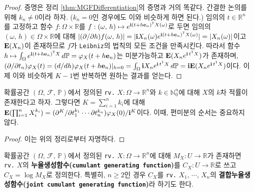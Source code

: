 \begin{proof}
    증명은 정리 \ref{thm:MGFDifferentiation}의 증명과 거의 똑같다. 간결한 논의를 위해 $k_n\ne0$이라 하자. ($k_n=0$인 경우에도 이와 비슷하게 하면 된다.) 임의의 $t\in\mathbb{R}^n$를 고정하고 함수 $f:\Omega\times\mathbb{R}$를 $f:(\omega,\,h)\mapsto e^{\mathbf{i}(t+h\mathbf{e}_n)^{\mathsf{T}} X(\omega)}$로 두면 임의의 $(\omega,\,h)\in\Omega\times\mathbb{R}$에 대해 $|(\partial/\partial h)f(\omega,\,h)|=|\mathbf{i} X_n(\omega)e^{\mathbf{i}(t+h\mathbf{e}_n)^{\mathsf{T}} X(\omega)}|=|X_n(\omega)|$이고 $\mathbf{E}(X_n)$이 존재하므로 $f$가 \texttt{Leibniz}의 법칙의 모든 조건을 만족시킨다. 따라서 함수 $h\mapsto\int_\Omega e^{\mathbf{i}(t+h\mathbf{e}_n)^{\mathsf{T}} X}\,d\mathbb{P}=\varphi_X(t+h\mathbf{e}_n)$는 미분가능하고 $\mathbf{E}(X_ne^{\mathbf{i}\,t^{\mathsf{T}} X})$가 존재하며, $(\partial/\partial t_n)\varphi_X(t)=(d/dh)\varphi_X(t+h\mathbf{e}_n)\vert_{h=0}=\int_\Omega\mathbf{i} X_ne^{\mathbf{i}\,t^{\mathsf{T}} X}\,d\mathbb{P}=\mathbf{i}\mathbf{E}(X_ne^{\mathbf{i}\,t^{\mathsf{T}} X})$이다. 이제 이와 비슷하게 $K-1$번 반복하면 원하는 결과를 얻는다.
\end{proof}

\begin{corollary}
    확률공간 $(\Omega,\,\mathcal{F},\,\mathbb{P})$에서 정의된 \texttt{rv.} $X:\Omega\to\mathbb{R}^n$와 $k\in\mathbb{N}_0^n$에 대해 $X$의 $k$차 적률이 존재한다고 하자. 그렇다면 $K=\sum_{i=1}^nk_i$에 대해 $\mathbf{E}(\prod_{i=1}^nX_i^{k_i})=(\partial^K/\partial t_1^{k_1}\cdots\partial t_n^{k_n})\varphi_X(0)/\mathbf{i}^K$이다. 이때, 편미분의 순서는 중요하지 않다.
\end{corollary}

\begin{proof}
    이는 위의 정리로부터 자명하다.
\end{proof}

\begin{definition}
    확률공간 $(\Omega,\,\mathcal{F},\,\mathbb{P})$에서 정의된 \texttt{rv.} $X:\Omega\to\mathbb{R}^n$에 대해 $M_X:U\to\mathbb{R}$가 존재하면 \texttt{rv.} $X$의 \textbf{누율생성함수(\texttt{cumulant generating function})}를 $C_X:U\to\mathbb{R}$로 쓰고 $C_X=\log M_X$로 정의한다. 특별히, $n\geq2$인 경우 $C_X$를 \texttt{rv.} $X_1,\,\cdots,\,X_n$의 \textbf{결합누율생성함수(\texttt{joint cumulant generating function})}라 하기도 한다.
\end{definition}

